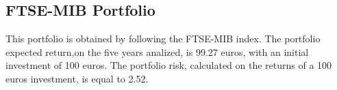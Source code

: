 \documentclass[12pt, a4paper, twocolumn]{article} %
\begin{document}
	\subsection{FTSE-MIB Portfolio}
	This portfolio is obtained by following the FTSE-MIB index.
	The portfolio expected return,on the five years analized, is 99.27 euros, with an initial investment of 100 euros. The portfolio risk, calculated on the returns of a 100 euros investment, is equal to 2.52.
	
	
	
	
\end{document}

